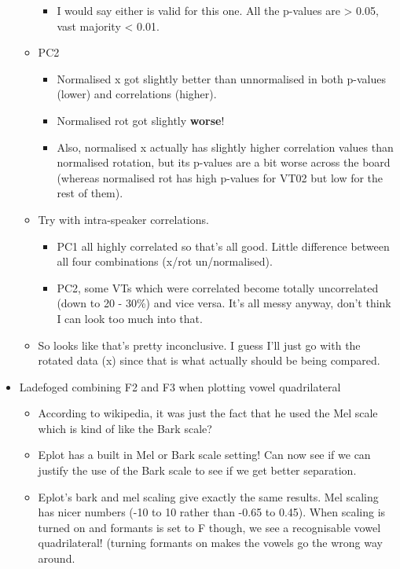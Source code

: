\documentclass{article}
\begin{document}
\begin{itemize}
\begin{itemize}
\begin{itemize}
            \item I would say either is valid for this one. All the p-values are > 0.05, vast majority < 0.01.
        \end{itemize}
        \item PC2
        \begin{itemize}
            \item Normalised x got slightly better than unnormalised in both p-values (lower) and correlations (higher). 
            \item Normalised rot got slightly \textbf{worse}!
            \item Also, normalised x actually has slightly higher correlation values than normalised rotation, but its p-values are a bit worse across the board (whereas normalised rot has high p-values for VT02 but low for the rest of them).
        \end{itemize}
        \item Try with intra-speaker correlations.
        \begin{itemize}
            \item PC1 all highly correlated so that's all good. Little difference between all four combinations (x/rot un/normalised).
            \item PC2, some VTs which were correlated become totally uncorrelated (down to 20 - 30\%) and vice versa. It's all messy anyway, don't think I can look too much into that. 
        \end{itemize}
        \item So looks like that's pretty inconclusive. I guess I'll just go with the rotated data (x) since that is what actually should be being compared.
    \end{itemize}
    \item Ladefoged combining F2 and F3 when plotting vowel quadrilateral
    \begin{itemize}
        \item According to wikipedia, it was just the fact that he used the Mel scale which is kind of like the Bark scale?
        \item Eplot has a built in Mel or Bark scale setting! Can now see if we can justify the use of the Bark scale to see if we get better separation.
        \item Eplot's bark and mel scaling give exactly the same results. Mel scaling has nicer numbers (-10 to 10 rather than -0.65 to 0.45). When scaling is turned on and formants is set to F though, we see a recognisable vowel quadrilateral! (turning formants on makes the vowels go the wrong way around.

\end{itemize}
\end{itemize}
\end{document}
